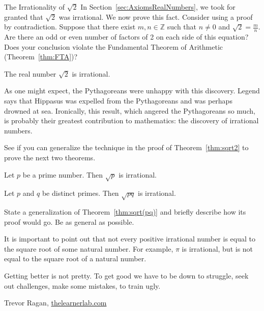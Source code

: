 \begin{section}{The Irrationality of $\sqrt{2}$}
In Section~\ref{sec:AxiomsRealNumbers}, we took for granted that $\sqrt{2}$ was irrational.  We now prove this fact. Consider using a proof by contradiction. Suppose that there exist $m,n\in\mathbb{Z}$ such that $n\ne 0$ and $\sqrt{2}=\frac{m}{n}$. Are there an odd or even number of factors of 2 on each side of this equation? Does your conclusion violate the Fundamental Theorem of Arithmetic (Theorem~\ref{thm:FTA})?

\begin{theorem}\label{thm:sqrt2}
The real number $\sqrt{2}$ is irrational.
\end{theorem}

As one might expect, the Pythagoreans were unhappy with this discovery. Legend says that Hippasus was expelled from the Pythagoreans and was perhaps drowned at sea. Ironically, this result, which angered the Pythagoreans so much, is probably their greatest contribution to mathematics: the discovery of irrational numbers.

See if you can generalize the technique in the proof of Theorem~\ref{thm:sqrt2} to prove the next two theorems.

\begin{theorem}\label{thm:sqrtp}
Let $p$ be a prime number.  Then $\sqrt{p}$ is irrational.
\end{theorem}

\begin{theorem}\label{thm:sqrt(pq)}
Let $p$ and $q$ be distinct primes.  Then $\sqrt{pq}$ is irrational.
\end{theorem}

\begin{problem}
State a generalization of Theorem~\ref{thm:sqrt(pq)} and briefly describe how its proof would go.  Be as general as possible.
\end{problem}

It is important to point out that not every positive irrational number is equal to the square root of some natural number.  For example, $\pi$ is irrational, but is not equal to the square root of a natural number.

\epigraph{Getting better is not pretty. To get good we have to be down to struggle, seek out challenges, make some mistakes, to train ugly.}{Trevor Ragan, \url{thelearnerlab.com}}

\end{section}
